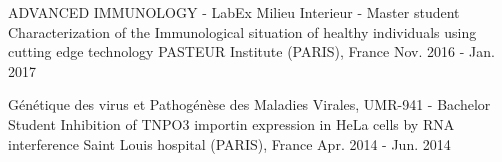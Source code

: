 \begin{cventries}
  \cventry
    {ADVANCED IMMUNOLOGY - LabEx Milieu Interieur - Master student} %
    {Characterization of the Immunological situation of healthy individuals using cutting edge technology} %
    {PASTEUR Institute (PARIS), France} %
    {Nov. 2016 - Jan. 2017} %
    {
      \begin{cvitems} %
      \end{cvitems}
    }

  \cventry
    {Génétique des virus et Pathogénèse des Maladies Virales, UMR-941 - Bachelor Student} %
    {Inhibition of TNPO3 importin expression in HeLa cells by RNA interference} %
    {Saint Louis hospital (PARIS), France} %
    {Apr. 2014 - Jun. 2014} %
    {
      \begin{cvitems} %
      \end{cvitems}
    }

\end{cventries}
